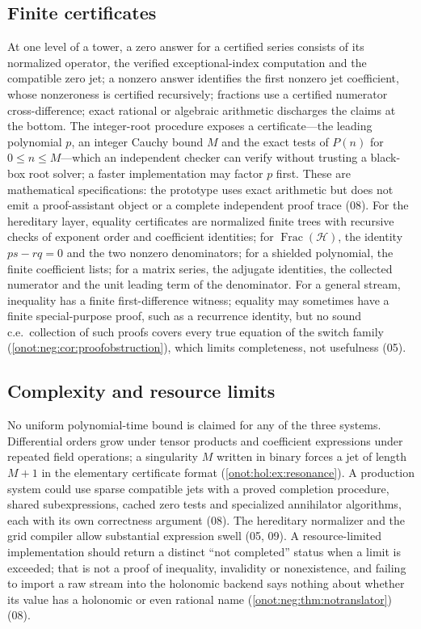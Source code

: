 \documentclass[11pt,oneside]{article}
\numberwithin{equation}{section}
\theoremstyle{definition}
\theoremstyle{remark}
\newcommand{\FH}{\operatorname{Frac}(\mathcal H)}
\begin{document}
\subsection{Finite certificates}

At one level of a tower, a zero answer for a certified series consists of its
normalized operator, the verified exceptional-index computation and the compatible
zero jet; a nonzero answer identifies the first nonzero jet coefficient, whose
nonzeroness is certified recursively; fractions use a certified numerator
cross-difference; exact rational or algebraic arithmetic discharges the claims at
the bottom. The integer-root procedure exposes a certificate---the leading
polynomial $p$, an integer Cauchy bound $M$ and the exact tests of $P(n)$ for
$0\le n\le M$---which an independent checker can verify without trusting a
black-box root solver; a faster implementation may factor $p$ first. These are
mathematical specifications: the prototype uses exact arithmetic but does not emit
a proof-assistant object or a complete independent proof trace (08). For the
hereditary layer, equality certificates are normalized finite trees with recursive
checks of exponent order and coefficient identities; for $\FH$, the identity
$ps-rq=0$ and the two nonzero denominators; for a shielded polynomial, the finite
coefficient lists; for a matrix series, the adjugate identities, the collected
numerator and the unit leading term of the denominator. For a general stream,
inequality has a finite first-difference witness; equality may sometimes have a
finite special-purpose proof, such as a recurrence identity, but no sound c.e.\
collection of such proofs covers every true equation of the switch family
(\cref{onot:neg:cor:proofobstruction}), which limits completeness, not usefulness
(05).

\subsection{Complexity and resource limits}

No uniform polynomial-time bound is claimed for any of the three systems.
Differential orders grow under tensor products and coefficient expressions under
repeated field operations; a singularity $M$ written in binary forces a jet of
length $M+1$ in the elementary certificate format (\cref{onot:hol:ex:resonance}). A
production system could use sparse compatible jets with a proved completion
procedure, shared subexpressions, cached zero tests and specialized annihilator
algorithms, each with its own correctness argument (08). The hereditary normalizer
and the grid compiler allow substantial expression swell (05, 09). A
resource-limited implementation should return a distinct ``not completed'' status
when a limit is exceeded; that is not a proof of inequality, invalidity or
nonexistence, and failing to import a raw stream into the holonomic backend says
nothing about whether its value has a holonomic or even rational name
(\cref{onot:neg:thm:notranslator}) (08).
\end{document}
